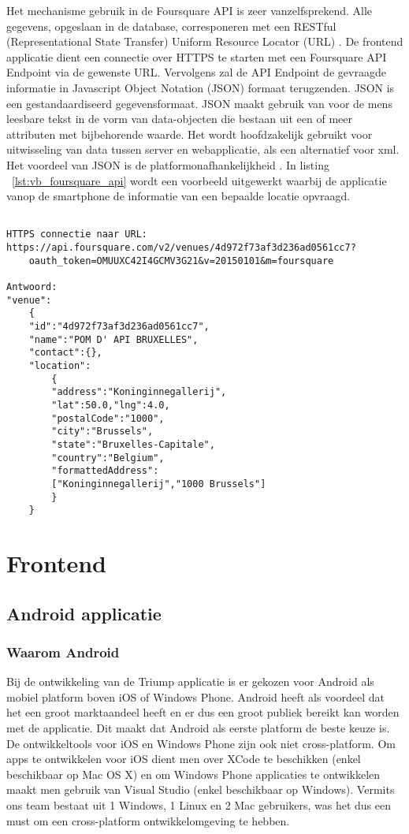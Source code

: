Het mechanisme gebruik in de Foursquare API is zeer vanzelfsprekend. Alle gegevens, opgeslaan in de database, corresponeren met een RESTful (Representational State Transfer) Uniform Resource Locator (URL)  \cite{FS_API_website}. De frontend applicatie dient een connectie over HTTPS te starten met een Foursquare API Endpoint via de gewenste URL. Vervolgens zal de API Endpoint de gevraagde informatie in Javascript Object Notation (JSON) formaat terugzenden. JSON is een gestandaardiseerd gegevensformaat. JSON maakt gebruik van voor de mens leesbare tekst in de vorm van data-objecten die bestaan uit een of meer attributen met bijbehorende waarde. Het wordt hoofdzakelijk gebruikt voor uitwisseling van data tussen server en webapplicatie, als een alternatief voor xml. Het voordeel van JSON is de platformonafhankelijkheid \cite{JSON_def}. In listing ~\ref{lst:vb_foursquare_api} wordt een voorbeeld uitgewerkt waarbij de applicatie vanop de smartphone de informatie van een bepaalde locatie opvraagd.


\begin{lstlisting}[caption={Voorbeeld: werking Foursquare API},label=lst:vb_foursquare_api]

HTTPS connectie naar URL:
https://api.foursquare.com/v2/venues/4d972f73af3d236ad0561cc7?
	oauth_token=OMUUXC42I4GCMV3G21&v=20150101&m=foursquare

Antwoord:
"venue":
	{
	"id":"4d972f73af3d236ad0561cc7",
	"name":"POM D' API BRUXELLES",
	"contact":{},
	"location":
		{
		"address":"Koninginnegallerij",
		"lat":50.0,"lng":4.0,
		"postalCode":"1000",
		"city":"Brussels",
		"state":"Bruxelles-Capitale",
		"country":"Belgium",
		"formattedAddress":
		["Koninginnegallerij","1000 Brussels"]
		}
	}
\end{lstlisting}
 


\section{Frontend}
\subsection{Android applicatie}
\subsubsection{Waarom Android}
% 
Bij de ontwikkeling van de Triump applicatie is er gekozen voor Android als mobiel platform boven iOS of Windows Phone. Android heeft als voordeel dat het een groot marktaandeel heeft en er dus een groot publiek bereikt kan worden met de applicatie. Dit maakt dat Android als eerste platform de beste keuze is. De ontwikkeltools voor iOS en Windows Phone zijn ook niet cross-platform. Om apps te ontwikkelen voor iOS dient men over XCode te beschikken (enkel beschikbaar op Mac OS X) en om Windows Phone applicaties te ontwikkelen maakt men gebruik van Visual Studio (enkel beschikbaar op Windows). Vermits ons team bestaat uit 1 Windows, 1 Linux en 2 Mac gebruikers, was het dus een must om een cross-platform ontwikkelomgeving te hebben.
